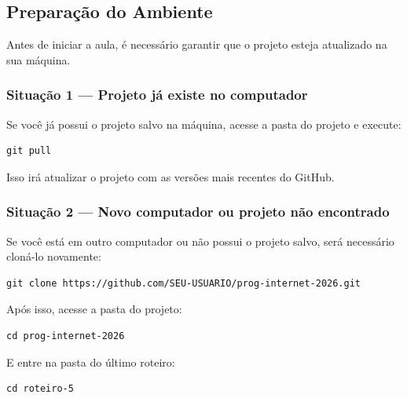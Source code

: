 \documentclass[12pt,a4paper]{article}
\begin{document}

\subsection{Preparação do Ambiente}

Antes de iniciar a aula, é necessário garantir que o projeto esteja atualizado na sua máquina.

\subsubsection{Situação 1 — Projeto já existe no computador}

Se você já possui o projeto salvo na máquina, acesse a pasta do projeto e execute:

\begin{boxCodigo}
\begin{verbatim}
git pull
\end{verbatim}
\end{boxCodigo}

Isso irá atualizar o projeto com as versões mais recentes do GitHub.

\subsubsection{Situação 2 — Novo computador ou projeto não encontrado}

Se você está em outro computador ou não possui o projeto salvo, será necessário cloná-lo novamente:

\begin{boxCodigo}
\begin{verbatim}
git clone https://github.com/SEU-USUARIO/prog-internet-2026.git
\end{verbatim}
\end{boxCodigo}

Após isso, acesse a pasta do projeto:

\begin{boxCodigo}
\begin{verbatim}
cd prog-internet-2026
\end{verbatim}
\end{boxCodigo}

E entre na pasta do último roteiro:

\begin{boxCodigo}
\begin{verbatim}
cd roteiro-5
\end{verbatim}
\end{boxCodigo}
\end{document}
